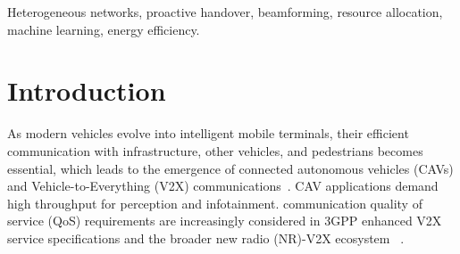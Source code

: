 \documentclass[10pt,journal,letterpaper]{journal_template/IEEEtran}
\newcommand{\rev}[1]{\textcolor{revisioncolor}{{}#1}}
\newif\ifshowdeletions
\newcommand{\currentdel}[1]{\ifshowdeletions\textcolor{deletioncolor}{\sout{#1}}\fi}
\theoremstyle{remark}
\begin{document}
\begin{IEEEkeywords}
Heterogeneous networks, proactive handover, beamforming, resource allocation, machine learning, energy efficiency.
\end{IEEEkeywords}

\section{Introduction}

As modern vehicles evolve into intelligent mobile terminals, their efficient communication with infrastructure, other vehicles, and pedestrians becomes essential, which leads to the emergence of connected autonomous vehicles (CAVs) and Vehicle-to-Everything (V2X) communications~\cite{c-v2x}. CAV applications demand \currentdel{a mix of} high throughput for perception and infotainment\currentdel{,}\currentdel{\space ultra-reliable and low-latency communication (uRLLC) for cooperative safety, and high energy efficiency}. \currentdel{Such diverse} communication quality of service (QoS) requirements are increasingly considered in 3GPP enhanced V2X service specifications and the broader new radio (NR)-V2X ecosystem
~\cite{3GPP-TS-22.186,bagheri2020nrv2x}. 
\end{document}
